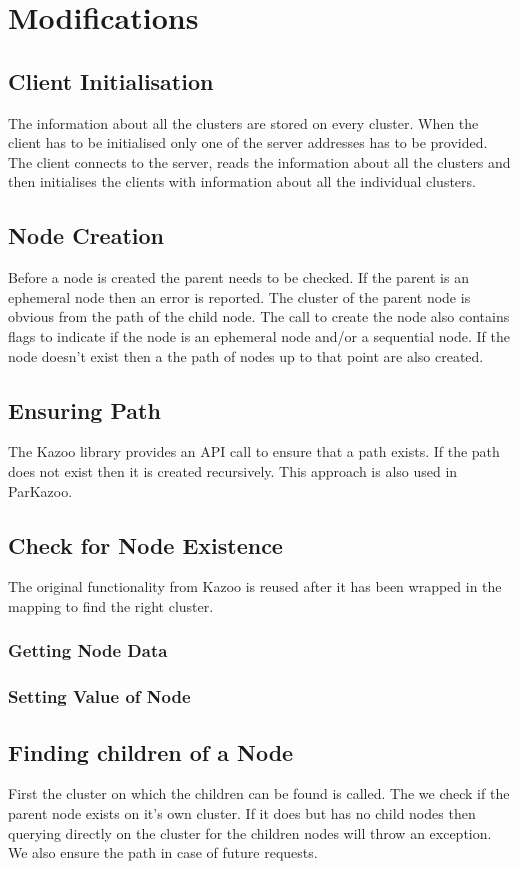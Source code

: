 \chapter{Modifications}

\section{Client Initialisation}
    The information about all the clusters are stored on every cluster. When the client has to be initialised only one of the server addresses has to be provided. The client connects to the server, reads the information about all the clusters and then initialises the clients with information about all the individual clusters.

\section{Node Creation}
Before a node is created the parent needs to be checked. If the parent is an ephemeral node then an error is reported. The cluster of the parent node is obvious from the path of the child node. The call to create the node also contains flags to indicate if the node is an ephemeral node and/or a sequential node. If the node doesn't exist then a the path of nodes up to that point are also created.

\section{Ensuring Path}
The Kazoo library provides an API call to ensure that a path exists. If the path does not exist then it is created recursively. This approach is also used in ParKazoo.

\section{Check for Node Existence}
The original functionality from Kazoo is reused after it has been wrapped in the mapping to find the right cluster.

\subsection{Getting Node Data}
\subsection{Setting Value of Node}

\section{Finding children of a Node}
    First the cluster on which the children can be found is called. The we check if the parent node exists on it's own cluster. If it does but has no child nodes then querying directly on the cluster for the children nodes will throw an exception. We also ensure the path in case of future requests.


